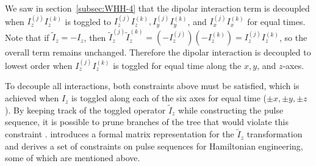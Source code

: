 We saw in section~\ref{subsec:WHH-4} that the dipolar interaction term is decoupled when $I_z^{(j)}I_z^{(k)}$ is toggled to $I_z^{(j)}I_z^{(k)}, I_y^{(j)}I_y^{(k)}$, and $I_x^{(j)}I_x^{(k)}$ for equal times.
Note that if $\widetilde{I}_z = -I_z$, then $\widetilde{I}_z^{(j)}\widetilde{I}_z^{(k)} = (-I_z^{(j)})(-I_z^{(k)}) = I_z^{(j)}I_z^{(k)}$, so the overall term remains unchanged.
Therefore the dipolar interaction is decoupled to lowest order when $I_z^{(j)}I_z^{(k)}$ is toggled for equal time along the $x, y$, and $z$-axes.

To decouple all interactions, both constraints above must be satisfied, which is achieved when $I_z$ is toggled along each of the six axes for equal time ($\pm x, \pm y, \pm z$). By keeping track of the toggled operator $\widetilde{I}_z$ while constructing the pulse sequence, it is possible to prune branches of the tree that would violate this constraint%
.
\cite{Choi_2020} introduces a formal matrix representation for the $\widetilde{I}_z$ transformation and derives a set of constraints on pulse sequences for Hamiltonian engineering, some of which are mentioned above.



